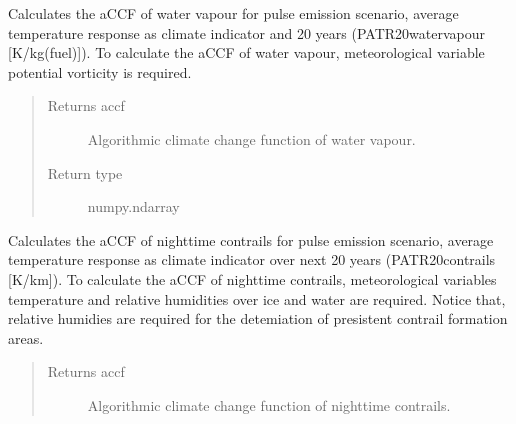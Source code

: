 \documentclass[a4paper,11pt,english]{sphinxmanual}
\begin{document}
\begin{fulllineitems}
\begin{fulllineitems}
\begin{quote}
\begin{description}
\end{description}\end{quote}

\end{fulllineitems}


\begin{fulllineitems}
\label{\detokenize{modules:envlib.accf.GeTaCCFs.accf_h2o}}
Calculates the aCCF of water vapour for pulse emission scenario, average temperature response as
climate indicator and 20 years (P\sphinxhyphen{}ATR20\sphinxhyphen{}water\sphinxhyphen{}vapour {[}K/kg(fuel){]}). To calculate the aCCF of water vapour,
meteorological variable potential vorticity is required.
\begin{quote}\begin{description}
\item[{Returns accf}] \leavevmode
Algorithmic climate change function of water vapour.

\item[{Return type}] \leavevmode
numpy.ndarray

\end{description}\end{quote}

\end{fulllineitems}


\begin{fulllineitems}
\label{\detokenize{modules:envlib.accf.GeTaCCFs.accf_ncontrail}}
Calculates the aCCF of night\sphinxhyphen{}time contrails for pulse emission scenario, average temperature response as
climate indicator over next 20 years (P\sphinxhyphen{}ATR20\sphinxhyphen{}contrails {[}K/km{]}). To calculate the aCCF of nighttime contrails,
meteorological variables temperature and relative humidities over ice and water are required. Notice that,
relative humidies are required for the detemiation of presistent contrail formation areas.
\begin{quote}\begin{description}
\item[{Returns accf}] \leavevmode
Algorithmic climate change function of nighttime contrails.


\end{description}
\end{quote}
\end{fulllineitems}
\end{fulllineitems}
\end{document}
